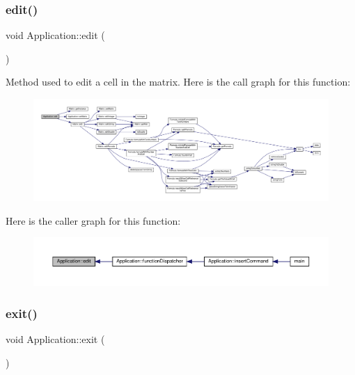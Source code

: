\subsubsection{\texorpdfstring{edit()}{edit()}}
{\footnotesize\ttfamily void Application\+::edit (\begin{DoxyParamCaption}{ }\end{DoxyParamCaption})\hspace{0.3cm}{\ttfamily [private]}}

Method used to edit a cell in the matrix. Here is the call graph for this function\+:\nopagebreak
\begin{figure}[H]
\begin{center}
\leavevmode
\includegraphics[width=350pt]{class_application_a4b193bf9c8be7105e89a2323ea77b1f4_cgraph}
\end{center}
\end{figure}
Here is the caller graph for this function\+:\nopagebreak
\begin{figure}[H]
\begin{center}
\leavevmode
\includegraphics[width=350pt]{class_application_a4b193bf9c8be7105e89a2323ea77b1f4_icgraph}
\end{center}
\end{figure}
\mbox{\label{class_application_a3c8a98d6c10a5b054800488df16cdbcb}} 
\subsubsection{\texorpdfstring{exit()}{exit()}}
{\footnotesize\ttfamily void Application\+::exit (\begin{DoxyParamCaption}{ }\end{DoxyParamCaption})\hspace{0.3cm}{\ttfamily [private]}}


